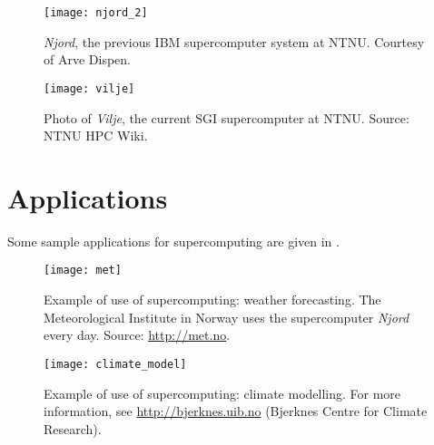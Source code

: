 \begin{figure}
  \centering
  \texttt{[image: njord\_2]}
  \caption{
    \emph{Njord}, the previous IBM supercomputer system at NTNU. Courtesy of
    Arve Dispen.
  }
  \label{fig:njord}
\end{figure}

\begin{figure}
  \centering
  \texttt{[image: vilje]}
  \caption{
    Photo of \emph{Vilje}, the current SGI supercomputer at NTNU.
    Source: NTNU HPC Wiki.
  }
  \label{fig:njord}
\end{figure}

\section{Applications}

Some sample applications for supercomputing are given in .

\vspace{2cm}
\begin{figure}[!ht]
  \centering
  \texttt{[image: met]}
  \caption{
    Example of use of supercomputing: weather forecasting. The Meteorological
    Institute in Norway uses the supercomputer \emph{Njord} every day. Source:
    \protect\url{http://met.no}.
  }
  \label{fig:met}
\end{figure}

\begin{figure}[!ht]
  \centering
  \texttt{[image: climate\_model]}
  \caption{
    Example of use of supercomputing: climate modelling. For more information,
    see \protect\url{http://bjerknes.uib.no} (Bjerknes Centre for Climate Research).
  }
  \label{fig:climate}
\end{figure}
